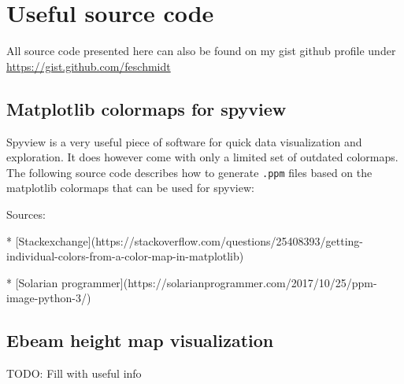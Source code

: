 \chapter{Useful source code}

\clearpage

All source code presented here can also be found on my gist github profile under \url{https://gist.github.com/feschmidt}

\section{Matplotlib colormaps for spyview}\label{app:spyview}
Spyview is a very useful piece of software for quick data visualization and exploration.
It does however come with only a limited set of outdated colormaps.
The following source code describes how to generate \texttt{.ppm} files based on the matplotlib colormaps that can be used for spyview:



Sources:

* [Stackexchange](https://stackoverflow.com/questions/25408393/getting-individual-colors-from-a-color-map-in-matplotlib)

* [Solarian programmer](https://solarianprogrammer.com/2017/10/25/ppm-image-python-3/)

\section{Ebeam height map visualization}
TODO: Fill with useful info




